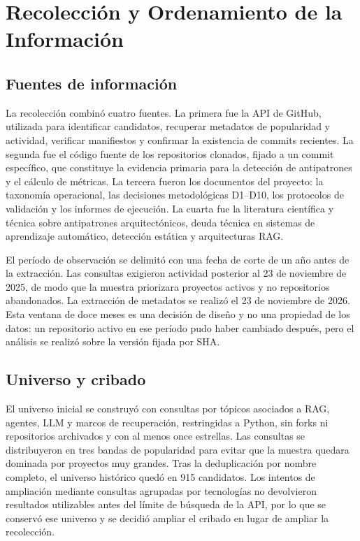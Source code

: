 \section{Recolección y Ordenamiento de la Información}

\subsection{Fuentes de información}

La recolección combinó cuatro fuentes. La primera fue la API de GitHub, utilizada para identificar candidatos, recuperar metadatos de popularidad y actividad, verificar manifiestos y confirmar la existencia de commits recientes. La segunda fue el código fuente de los repositorios clonados, fijado a un commit específico, que constituye la evidencia primaria para la detección de antipatrones y el cálculo de métricas. La tercera fueron los documentos del proyecto: la taxonomía operacional, las decisiones metodológicas D1--D10, los protocolos de validación y los informes de ejecución. La cuarta fue la literatura científica y técnica sobre antipatrones arquitectónicos, deuda técnica en sistemas de aprendizaje automático, detección estática y arquitecturas RAG.

El período de observación se delimitó con una fecha de corte de un año antes de la extracción. Las consultas exigieron actividad posterior al 23 de noviembre de 2025, de modo que la muestra priorizara proyectos activos y no repositorios abandonados. La extracción de metadatos se realizó el 23 de noviembre de 2026. Esta ventana de doce meses es una decisión de diseño y no una propiedad de los datos: un repositorio activo en ese período pudo haber cambiado después, pero el análisis se realizó sobre la versión fijada por SHA.

\subsection{Universo y cribado}

El universo inicial se construyó con consultas por tópicos asociados a RAG, agentes, LLM y marcos de recuperación, restringidas a Python, sin forks ni repositorios archivados y con al menos once estrellas. Las consultas se distribuyeron en tres bandas de popularidad para evitar que la muestra quedara dominada por proyectos muy grandes. Tras la deduplicación por nombre completo, el universo histórico quedó en 915 candidatos. Los intentos de ampliación mediante consultas agrupadas por tecnologías no devolvieron resultados utilizables antes del límite de búsqueda de la API, por lo que se conservó ese universo y se decidió ampliar el cribado en lugar de ampliar la recolección.

